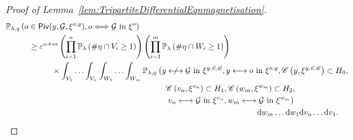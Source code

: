 \documentclass[10pt,a4paper,dvipsnames]{article}
\theoremstyle{definition}
\theoremstyle{remark}
\newcommand{\pla}{\mathbb P_\lambda}
\newcommand{\plaq}{\mathbb{P}_{\lambda,q}}
\newcommand{\dd}{\mathrm{d}} %
\newcommand{\C}{\mathscr {C}}
\newcommand{\piv}[1]{\mathsf {Piv}(#1)}
\newcommand{\Gcal}{\mathcal{G}}
\newcommand{\conn}[3]{#1 \longleftrightarrow #2\textrm { in } #3}
\newcommand{\nconn}[3]{#1 \centernot\longleftrightarrow #2\textrm { in } #3}
\newcommand{\dconn}[3]{#1 \Longleftrightarrow #2\textrm { in } #3}
\newcommand{\orig}{o}
\numberwithin{equation}{section}
\begin{document}
\begin{proof}[Proof of Lemma~\ref{lem:TripartiteDifferentialEqnmagnetisation}]
    \begin{align}
        &\plaq\left(\orig\in\piv{y,\Gcal,\xi^{\orig, y}}, \dconn{\orig}{\Gcal}{\xi^\orig}\right) \nonumber\\
        &\hspace{1cm} \geq \varepsilon^{n+m}\left(\prod^n_{i=1}\pla\left(\#\eta\cap V_i\geq 1\right)\right)\left(\prod^m_{i=1}\pla\left(\#\eta\cap W_i\geq 1\right)\right)\nonumber\\
        &\hspace{2cm} \times \int_{V_1}\ldots\int_{V_n}\int_{W_1}\ldots\int_{W_m}  \plaq\left(\nconn{y}{\Gcal}{\xi^{y,\vec{v},\vec{w}}},\conn{y}{\orig}{\xi^{\orig,y}},
        \C\left(y,\xi^{y,\vec{v},\vec{w}}\right)\subset H_0,\right.\nonumber\\
        &\hspace{7cm} \C\left(v_n,\xi^{v_n}\right)\subset H_1, \C\left(w_m,\xi^{w_m}\right)\subset H_2,\nonumber\\
        &\hspace{7cm} \left.\conn{v_n}{\Gcal}{\xi^{v_n}}, \conn{w_m}{\Gcal}{\xi^{w_m}}\right)\nonumber\\
        &\hspace{11cm}\dd w_m \ldots \dd w_1\dd v_n \ldots \dd v_1.
    \end{align}
    

\end{proof}
\end{document}
